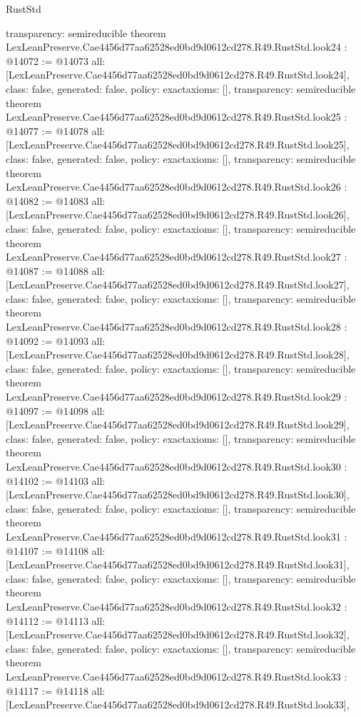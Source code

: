 \begin{lexlean}{RustStd}
\begin{coremodule}
{  transparency: semireducible
}
theorem LexLeanPreserve.Cae4456d77aa62528ed0bd9d0612cd278.R49.RustStd.look24 : @14072 := @14073 {
  all: [LexLeanPreserve.Cae4456d77aa62528ed0bd9d0612cd278.R49.RustStd.look24],
  class: false,
  generated: false,
  policy: exact{axioms: []},
  transparency: semireducible
}
theorem LexLeanPreserve.Cae4456d77aa62528ed0bd9d0612cd278.R49.RustStd.look25 : @14077 := @14078 {
  all: [LexLeanPreserve.Cae4456d77aa62528ed0bd9d0612cd278.R49.RustStd.look25],
  class: false,
  generated: false,
  policy: exact{axioms: []},
  transparency: semireducible
}
theorem LexLeanPreserve.Cae4456d77aa62528ed0bd9d0612cd278.R49.RustStd.look26 : @14082 := @14083 {
  all: [LexLeanPreserve.Cae4456d77aa62528ed0bd9d0612cd278.R49.RustStd.look26],
  class: false,
  generated: false,
  policy: exact{axioms: []},
  transparency: semireducible
}
theorem LexLeanPreserve.Cae4456d77aa62528ed0bd9d0612cd278.R49.RustStd.look27 : @14087 := @14088 {
  all: [LexLeanPreserve.Cae4456d77aa62528ed0bd9d0612cd278.R49.RustStd.look27],
  class: false,
  generated: false,
  policy: exact{axioms: []},
  transparency: semireducible
}
theorem LexLeanPreserve.Cae4456d77aa62528ed0bd9d0612cd278.R49.RustStd.look28 : @14092 := @14093 {
  all: [LexLeanPreserve.Cae4456d77aa62528ed0bd9d0612cd278.R49.RustStd.look28],
  class: false,
  generated: false,
  policy: exact{axioms: []},
  transparency: semireducible
}
theorem LexLeanPreserve.Cae4456d77aa62528ed0bd9d0612cd278.R49.RustStd.look29 : @14097 := @14098 {
  all: [LexLeanPreserve.Cae4456d77aa62528ed0bd9d0612cd278.R49.RustStd.look29],
  class: false,
  generated: false,
  policy: exact{axioms: []},
  transparency: semireducible
}
theorem LexLeanPreserve.Cae4456d77aa62528ed0bd9d0612cd278.R49.RustStd.look30 : @14102 := @14103 {
  all: [LexLeanPreserve.Cae4456d77aa62528ed0bd9d0612cd278.R49.RustStd.look30],
  class: false,
  generated: false,
  policy: exact{axioms: []},
  transparency: semireducible
}
theorem LexLeanPreserve.Cae4456d77aa62528ed0bd9d0612cd278.R49.RustStd.look31 : @14107 := @14108 {
  all: [LexLeanPreserve.Cae4456d77aa62528ed0bd9d0612cd278.R49.RustStd.look31],
  class: false,
  generated: false,
  policy: exact{axioms: []},
  transparency: semireducible
}
theorem LexLeanPreserve.Cae4456d77aa62528ed0bd9d0612cd278.R49.RustStd.look32 : @14112 := @14113 {
  all: [LexLeanPreserve.Cae4456d77aa62528ed0bd9d0612cd278.R49.RustStd.look32],
  class: false,
  generated: false,
  policy: exact{axioms: []},
  transparency: semireducible
}
theorem LexLeanPreserve.Cae4456d77aa62528ed0bd9d0612cd278.R49.RustStd.look33 : @14117 := @14118 {
  all: [LexLeanPreserve.Cae4456d77aa62528ed0bd9d0612cd278.R49.RustStd.look33],
}
\end{coremodule}
\end{lexlean}
